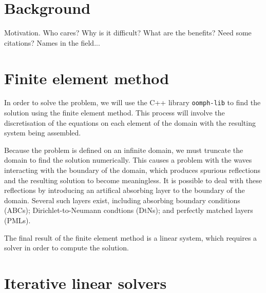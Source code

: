 \iffalse Brief outline of the chapter below

Background:
	What is HH equation?
	What does it model?
	How is it derived?
	Boundary conditions
	- 	Sommerfield radiation condition
	
Finite element method:
	Discretisation of HH
	Discretisation of infinite domains
		D,N,radiation
	ABC, DtN, PML

Linear solvers:
	Iterative and direct
	Krylov methods
	Preconditioners
	How does this relate to Poisson and HH?
	- 	Small wavenumbers good convergence

Project direction:
	Where are we going? What to do...?
	Multigrid in non-cartesian coordinates
	Fourier decompostion of HH
	Explore implementation of PMLs
\fi


\section{Background}

Motivation.
Who cares? Why is it difficult?
What are the benefits?
Need some citations? Names in the field...



\section{Finite element method}

In order to solve the problem, we will use the C++ library \texttt{oomph-lib} to find the solution using the finite element method.
This process will involve the discretisation of the equations on each element of the domain with the resulting system being assembled.

Because the problem is defined on an infinite domain, we must truncate the domain to find the solution numerically.
This causes a problem with the waves interacting with the boundary of the domain, which produces spurious reflections and the resulting solution to become meaningless.
It is possible to deal with these reflections by introducing an artifical absorbing layer to the boundary of the domain.
Several such layers exist, including absorbing boundary conditions (ABCs); Dirichlet-to-Neumann condtions (DtNs); and perfectly matched layers (PMLs).

The final result of the finite element method is a linear system, which requires a solver in order to compute the solution.

\section{Iterative linear solvers}

